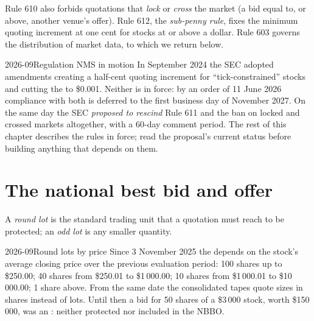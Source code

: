 Rule 610 also forbids quotations that \emph{lock} or \emph{cross} the market
(a bid equal to, or above, another venue's offer). Rule 612, the
\emph{sub-penny rule}, fixes the minimum quoting increment at one cent for
stocks at or above a dollar. Rule 603 governs the distribution of market
data, to which we return below.

\begin{dated}{2026-09}{Regulation NMS in motion}\label{dat:m1:us-equity-market-structure:nms}
In September 2024 the SEC adopted amendments creating a half-cent quoting
increment for ``tick-constrained'' stocks and cutting the  to
\$0.001. Neither is in force: by an order of 11 June 2026 compliance with
both is deferred to the first business day of November 2027. On the same day
the SEC \emph{proposed to rescind} Rule 611 and the ban on locked and crossed
markets altogether, with a 60-day comment period. The rest of this chapter
describes the rules in force; read the proposal's current status before
building anything that depends on them.
\end{dated}

\section{The national best bid and offer}

\begin{definition}\label{def:m1:us-equity-market-structure:lots}
A \emph{round lot} is the standard trading unit that a
quotation must reach to be protected; an \emph{odd lot} is any
smaller quantity.
\end{definition}

\begin{dated}{2026-09}{Round lots by price}\label{dat:m1:us-equity-market-structure:lots}
Since 3 November 2025 the  depends on the stock's average closing
price over the previous evaluation period: 100 shares up to \$250.00; 40
shares from \$250.01 to \$1\,000.00; 10 shares from \$1\,000.01 to
\$10\,000.00; 1 share above. From the same date the consolidated tapes quote
sizes in shares instead of lots. Until then a bid for 50 shares of a
\$3\,000 stock, worth \$150\,000, was an : neither protected nor
included in the NBBO.
\end{dated}

